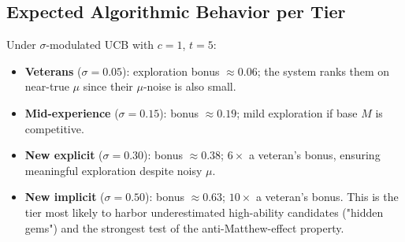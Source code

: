 \documentclass[11pt]{article}
\begin{document}
\subsection{Expected Algorithmic Behavior per Tier}

Under $\sigma$-modulated UCB with $c = 1$, $t = 5$:

\begin{itemize}
\item \textbf{Veterans} ($\sigma = 0.05$): exploration bonus $\approx 0.06$;
the system ranks them on near-true $\mu$ since their $\mu$-noise is also small.
\item \textbf{Mid-experience} ($\sigma = 0.15$): bonus $\approx 0.19$; mild
exploration if base $M$ is competitive.
\item \textbf{New explicit} ($\sigma = 0.30$): bonus $\approx 0.38$; $6\times$
a veteran's bonus, ensuring meaningful exploration despite noisy $\mu$.
\item \textbf{New implicit} ($\sigma = 0.50$): bonus $\approx 0.63$; $10\times$
a veteran's bonus. This is the tier most likely to harbor underestimated
high-ability candidates ("hidden gems") and the strongest test of the
anti-Matthew-effect property.
\end{itemize}
\end{document}
